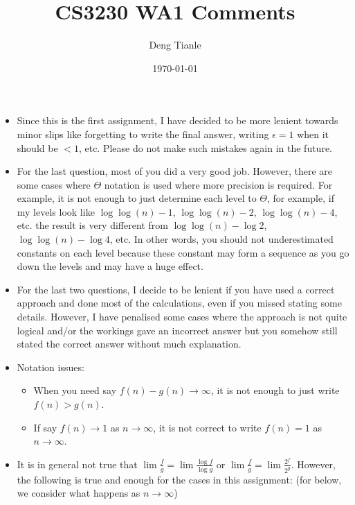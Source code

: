 \documentclass{scrartcl}
\begin{document}
\newtheorem{theorem}{Theorem}[subsection]
\newtheorem{lemma}[theorem]{Lemma}
\newtheorem{corollary}[theorem]{Corollary}
\newtheorem{proposition}[theorem]{Proposition}

\newtheorem{definition}{Definition}[subsection]

\theoremstyle{remark}
\newtheorem*{remark}{Remark}
\newtheorem*{example}{Example}
\newtheorem*{examples}{Examples}

\title{CS3230 WA1 Comments}
\author{Deng Tianle}
\date{\today}
\maketitle

\begin{itemize}
  \item Since this is the first assignment, I have decided to be more lenient towards minor slips like forgetting to write the final answer, writing $\epsilon=1$ when it should be $<1$, etc. Please do not make such mistakes again in the future. 
  \item For the last question, most of you did a very good job. However, there are some cases where $\Theta$ notation is used where more precision is required. For example, it is not enough to just determine each level to $\Theta$, for example, if my levels look like $\log\log(n)-1$, $\log\log(n)-2$, $\log\log(n)-4$, etc. the result is very different from $\log\log(n)-\log{2}$, $\log\log(n)-\log{4}$, etc. In other words, you should not underestimated constants on each level because these constant may form a sequence as you go down the levels and may have a huge effect. 
  \item For the last two questions, I decide to be lenient if you have used a correct approach and done most of the calculations, even if you missed stating some details. However, I have penalised some cases where the approach is not quite logical and/or the workings gave an incorrect answer but you somehow still stated the correct answer without much explanation. 
  \item Notation issues: \begin{itemize}
    \item When you need say $f(n)-g(n) \to \infty$, it is not enough to just write $f(n) > g(n)$. 
    \item If say $f(n) \to 1$ as $n \to \infty$, it is not correct to write $f(n)=1$ as $n \to \infty$. 
  \end{itemize}
  \item It is in general not true that $\lim \frac{f}{g} = \lim \frac{\log{f}}{\log{g}}$ or $\lim \frac{f}{g} = \lim \frac{2^{f}}{2^{g}}$. However, the following is true and enough for the cases in this assignment: (for below, we consider what happens as $n \to \infty$) \begin{enumerate}

\end{enumerate}
\end{itemize}
\end{document}
